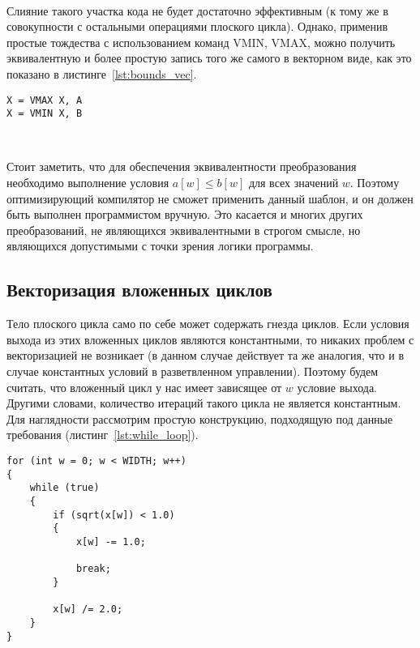 \documentclass[
11pt,%
tightenlines,%
twoside,%
onecolumn,%
nofloats,%
nobibnotes,%
nofootinbib,%
superscriptaddress,%
noshowpacs,%
centertags]%
{revtex4}
\begin{document}
\

Слияние такого участка кода не будет достаточно эффективным (к тому же в совокупности с остальными операциями плоского цикла).
Однако, применив простые тождества с использованием команд VMIN, VMAX, можно получить эквивалентную и более простую запись того же самого в векторном виде, как это показано в листинге~\ref{lst:bounds_vec}.

\begin{lstlisting}[caption={Векторизованная форма ограничения значения величины с помощью нижней и верхней границ.},label={lst:bounds_vec}]
X = VMAX X, A
X = VMIN X, B
\end{lstlisting}

\

Стоит заметить, что для обеспечения эквивалентности преобразования необходимо выполнение условия $a[w] \le b[w]$ для всех значений $w$.
Поэтому оптимизирующий компилятор не сможет применить данный шаблон, и он должен быть выполнен программистом вручную.
Это касается и многих других преобразований, не являющихся эквивалентными в строгом смысле, но являющихся допустимыми с точки зрения логики программы.

\subsection{Векторизация вложенных циклов}

Тело плоского цикла само по себе может содержать гнезда циклов.
Если условия выхода из этих вложенных циклов являются константными, то никаких проблем с векторизацией не возникает (в данном случае действует та же аналогия, что и в случае константных условий в разветвленном управлении).
Поэтому будем считать, что вложенный цикл у нас имеет зависящее от $w$ условие выхода.
Другими словами, количество итераций такого цикла не является константным.
Для наглядности рассмотрим простую конструкцию, подходящую под данные требования (листинг~\ref{lst:while_loop}).

\begin{lstlisting}[caption={Плоский цикл, содержащий цикл с неконстантным числом итераций},label={lst:while_loop}]
for (int w = 0; w < WIDTH; w++)
{
    while (true)
    {
        if (sqrt(x[w]) < 1.0)
        {
            x[w] -= 1.0;

            break;
        }
            
        x[w] /= 2.0;
    }
}
\end{lstlisting}

\
\end{document}
